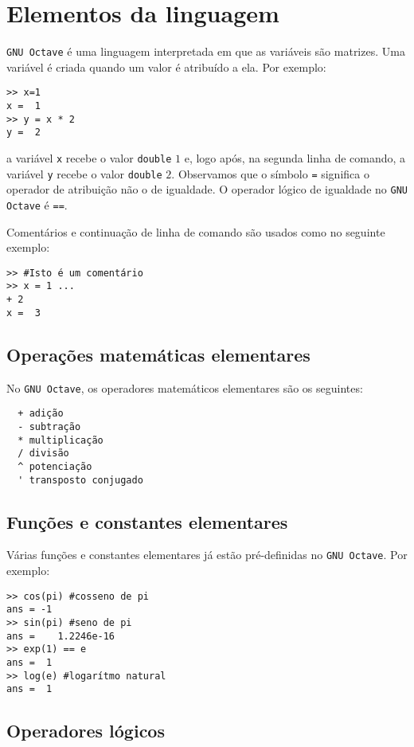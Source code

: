 \section{Elementos da linguagem}

\verb+GNU Octave+ é uma linguagem interpretada em que as variáveis são matrizes. Uma variável é criada quando um valor é atribuído a ela. Por exemplo:
\begin{verbatim}
>> x=1
x =  1
>> y = x * 2
y =  2  
\end{verbatim}
a variável \verb+x+ recebe o valor \verb+double+ $1$ e, logo após, na segunda linha de comando, a variável \verb+y+ recebe o valor \verb+double+ $2$. Observamos que o símbolo \verb+=+ significa o operador de atribuição não o de igualdade. O operador lógico de igualdade no \verb+GNU Octave+ é \verb+==+.

Comentários e continuação de linha de comando são usados como no seguinte exemplo:
\begin{verbatim}
>> #Isto é um comentário
>> x = 1 ...
+ 2
x =  3  
\end{verbatim}

\subsection{Operações matemáticas elementares}

No \verb+GNU Octave+, os operadores matemáticos elementares são os seguintes:
\begin{verbatim}
  + adição
  - subtração
  * multiplicação
  / divisão
  ^ potenciação
  ' transposto conjugado
\end{verbatim}

\subsection{Funções e constantes elementares}

Várias funções e constantes elementares já estão pré-definidas no \verb+GNU Octave+. Por exemplo:
\begin{verbatim}
>> cos(pi) #cosseno de pi
ans = -1
>> sin(pi) #seno de pi
ans =    1.2246e-16
>> exp(1) == e
ans =  1
>> log(e) #logarítmo natural
ans =  1
\end{verbatim}

\subsection{Operadores lógicos}

